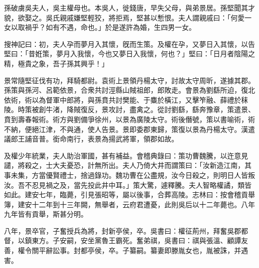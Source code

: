 
\begin{pinyinscope}
孫破虜吳夫人，吳主權母也。本吳人，徙錢唐，早失父母，與弟景居。孫堅聞其才貌，欲娶之。吳氏親戚嫌堅輕狡，將拒焉，堅甚以慙恨。夫人謂親戚曰：「何愛一女以取禍乎？如有不遇，命也。」於是遂許為婚，生四男一女。

搜神記曰：初，夫人孕而夢月入其懷，旣而生策。及權在孕，又夢日入其懷，以告堅曰：「昔姙策，夢月入我懷，今也又夢日入我懷，何也？」堅曰：「日月者陰陽之精，極貴之象，吾子孫其興乎！」

景常隨堅征伐有功，拜騎都尉。袁術上景領丹楊太守，討故太守周昕，遂據其郡。孫策與孫河、呂範依景，合衆共討涇縣山賊祖郎，郎敗走。會景為劉繇所迫，復北依術，術以為督軍中郎將，與孫賁共討樊能、于麋於橫江，又擊笮融、薛禮於秣陵。時策被創牛渚，降賊復反，景攻討，盡禽之。從討劉繇，繇奔豫章，策遣景、賁到壽春報術。術方與劉備爭徐州，以景為廣陵太守。術後僭號，策以書喻術，術不納，便絕江津，不與通，使人告景。景即委郡東歸，策復以景為丹楊太守。漢遣議郎王誧音普。銜命南行，表景為揚武將軍，領郡如故。

及權少年統業，夫人助治軍國，甚有補益。會稽典錄曰：策功曹魏騰，以迕意見譴，將殺之，士大夫憂恐，計無所出。夫人乃倚大井而謂策曰：「汝新造江南，其事未集，方當優賢禮士，捨過錄功。魏功曹在公盡規，汝今日殺之，則明日人皆叛汝。吾不忍見禍之及，當先投此井中耳。」策大驚，遽釋騰。夫人智略權譎，類皆如此。建安七年，臨薨，引見張昭等，屬以後事，合葬高陵。志林曰：按會稽貢舉簿，建安十二年到十三年闕，無舉者，云府君遭憂，此則吳后以十二年薨也。八年九年皆有貢舉，斯甚分明。

八年，景卒官，子奮授兵為將，封新亭侯，卒。吳書曰：權征荊州，拜奮吳郡都督，以鎮東方。子安嗣，安坐黨魯王霸死。奮弟祺，吳書曰：祺與張溫、顧譚友善，權令關平辭訟事。封都亭侯，卒。子纂嗣。纂妻即滕胤女也，胤被誅，并遇害。


\end{pinyinscope}